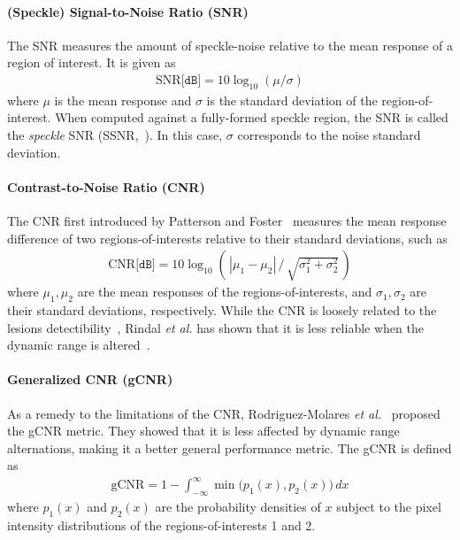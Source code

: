 \paragraph{(Speckle) Signal-to-Noise Ratio (SNR)}
The SNR measures the amount of speckle-noise relative to the mean response of a region of interest.
It is given as
{\small
\begin{align}
  \mathrm{SNR} \texttt{[dB]} = 10 \log_{10} \left({\mu}/{\sigma}\right)
\end{align}
}
{\noindent}where \(\mu\) is the mean response and \(\sigma\) is the standard deviation of the region-of-interest.
When computed against a fully-formed speckle region, the SNR is called the \textit{speckle} SNR (SSNR,~\cite{burckhardt_speckle_1978}).
In this case, \(\sigma\) corresponds to the noise standard deviation.

\paragraph{Contrast-to-Noise Ratio (CNR)}
The CNR first introduced by Patterson and Foster~\cite{patterson_improvement_1983} measures the mean response difference of two regions-of-interests relative to their standard deviations, such as
\begin{align}
  \mathrm{CNR} \texttt{[dB]} = 10 \log_{10} \left(\,| \mu_{1} - \mu_{2} | \,/\, \sqrt{\sigma^2_1 + \sigma^2_2}\, \right)
\end{align}
{\noindent}where \(\mu_1, \mu_2\) are the mean responses of the regions-of-interests, and \(\sigma_1, \sigma_2\) are their standard deviations, respectively.
While the CNR is loosely related to the lesions detectibility~\cite{smith_ultrasound_1984}, Rindal \textit{et al.} has shown that it is less reliable when the dynamic range is altered~\cite{rindal_effect_2019}.



%

\paragraph{Generalized CNR (gCNR)}
As a remedy to the limitations of the CNR, Rodriguez-Molares \textit{et al.}~\cite{rodriguez-molares_generalized_2020} proposed the gCNR metric.
They showed that it is less affected by dynamic range alternations, making it a better general performance metric.
The gCNR is defined as
{\small
\begin{align}
  \text{gCNR} = 1 - \int_{-\infty}^{\infty} \min\big(p_1\left(x\right), p_2\left(x\right)\big) \, dx
\end{align}
}
{\noindent}where \(p_1\left(x\right)\) and \(p_2\left(x\right)\) are the probability densities of \(x\) subject to the pixel intensity distributions of the regions-of-interests 1 and 2.

